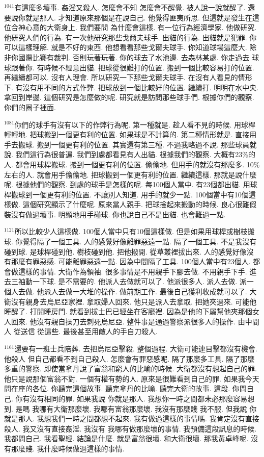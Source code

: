 \documentclass{book}
\begin{document}
$^{1041}$有這麼多壞事.
姦淫又殺人.
怎麼會不知 怎麼會不醒覺.
被人說一說就醒了.
還要說你就是那人.
才知道原來那個是在說自己.
他覺得匪夷所思.
但這就是發生在這位合神心意的大衛身上.
我們要問 為什麼會這樣.
有一位行為經濟學家.
他做研究.
他研究人們的行為.
有一次他研究那些戈爾夫球手.
出貓的行為.
出貓就是犯罪.
你可以這樣理解.
就是不好的東西.
他想看看那些戈爾夫球手.
你知道球場這麼大.
除非你國際比賽有裁判.
否則玩著玩著.
你的球去了水池邊.
去森林某處.
你走過去 球球跟著你.
有時候不經意出貓.
把球從很難打的位置.
搬到一個比較容易打的位置.
再繼續都可以.
沒有人理會.
所以研究一下那些戈爾夫球手.
在沒有人看見的情形下.
有沒有用不同的方式作弊.
把球放到一個比較好的位置.
繼續打.
明明在水中央.
拿回到岸邊.
這個研究是怎麼做的呢.
研究就是訪問那些球手們.
根據你們的觀察.
你們的圈子裡面.

$^{1081}$你們的球手有沒有以下的作弊行為呢.
第一種就是.
趁人看不見的時候.
用球桿輕輕地.
把球搬到一個更有利的位置.
如果球是不計算的.
第二種情形就是.
直接用手去搬球.
搬到一個更有利的位置.
其實還有第三種.
不過我略過不說.
那些球員就說.
我們這行為很普遍.
我們到處都看見有人出貓.
根據我們的觀察.
大概有23\%的人.
都會用球桿搬球.
搬到一個更有利的位置.
偷偷地.
但用手的就沒有那麼多.
10\%左右的人.
就會用手偷偷地.
把球搬到一個更有利的位置.
繼續這樣.
那就是說什麼呢.
根據他們的觀察.
到處的球手是怎樣的呢.
每100個人當中.
有23個都出貓.
用球桿搬球到一個更有利的位置.
不讓別人知道.
用手的就少一點.
100個當中有10個這樣做.
這個研究顯示了什麼呢.
原來當人親手.
把球撿起來搬動的時候.
良心很難假裝沒有做過壞事.
明顯地用手碰球.
你也說自己不是出貓.
也會難過一點.

$^{1121}$所以比較少人這樣做.
100個人當中只有10個這樣做.
但是如果用球桿或樹枝搬球.
你覺得隔了一個工具.
人的感覺好像離罪惡遠一點.
隔了一個工具.
不是我沒有碰到球.
是球桿碰到他.
樹枝碰到他.
把他撥開.
從草叢裡拔出來.
人的感覺好像沒有那麼有罪惡感.
可能離罪惡遠一點.
因為中間隔了工具.
100個人當中有23個人.
都會做這樣的事情.
大衛作為領袖.
很多事情是不用親手下腳去做.
不用親手下手.
進去三袖動一下球.
是不需要的.
他派人去做就可以了.
他派很多人.
派人去做.
派一個人去做.
他派人去做一大堆的操作.
做前期工作.
最後自己獲利收成就可以了.
大衛沒有親身去烏尼亞家裡.
拿取婦人回來.
他只是派人去拿取.
把她夾過來.
可能他睡醒了.
打開睡房門.
就看到拔士巴已經坐在客廳裡.
因為是他的下屬幫他夾那個女人回來.
他沒有親自操刀去刺死烏尼亞.
整件事是通過警察派很多人的操作.
由中間人 從送信 從這些.
最後甚至用敵人的手自刀殺人.

$^{1161}$還要有一班士兵陪葬.
去把烏尼亞擊殺.
整個過程.
大衛可能連目擊都沒有機會.
他殺人 但自己都看不到自己殺人.
怎麼會有罪惡感呢.
隔了那麼多工具.
隔了那麼多重的警察.
即使當拿丹說了富翁和窮人的比喻的時候.
大衛都沒有想起自己的罪.
他只是說那個富翁不對.
一個有權有勢的人.
原來是很難看到自己的罪.
如果我今天問在座的各位.
你聽完這個故事.
聽完拿丹的比喻.
聽完大衛的故事.
這段.
你問自己.
你有沒有相同的罪.
如果我說 你就是那人.
我想你一時之間都未必那麼容易想到.
是嗎 我哪有大衛那麼壞.
我哪有富翁那麼壞.
我沒有那麼賤 我不服.
但我說 你就是那人.
我想我們一時之間都想不起來.
我有做過這樣的事情嗎.
我肯定沒有直接殺人.
我又沒有直接姦淫.
我沒有 我哪有做那麼壞的事情.
我預備這段訊息的時候.
我都問自己.
我看聖經.
結論是什麼.
就是富翁很壞.
和大衛很壞.
那我黃卓峰呢.
沒有那麼賤.
我什麼時候做過這樣的事情.
\end{document}
